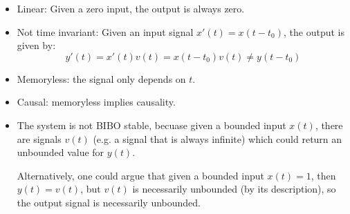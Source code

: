 \documentclass[10pt]{article}
\begin{document}
\begin{enumerate}[label=\alph*)]
			\begin{solution}
				\begin{itemize}
					\item Linear: Given a zero input, the output is always zero.
					\item Not time invariant: Given an input signal \( x'(t) = x(t - t_0) \), the output is given by: 
						\[
						y'(t) = x'(t)v(t) = x(t - t_0) v(t)  \neq y(t - t_0)
						\] 
					\item Memoryless: the signal only depends on \( t \). 
					\item Causal: memoryless implies causality.
					\item The system is not BIBO stable, becuase given a bounded input \( x(t) \), there are 
						signals \( v(t) \) (e.g. a signal that is always infinite) which could return 
						an unbounded value for \( y(t) \).  

						Alternatively, one could argue that given a bounded input \( x(t) = 1 \), then 
						\( y(t) = v(t) \), but \( v(t)  \) is necessarily unbounded (by its description), so the 
						output signal is necessarily unbounded. 
				\end{itemize}
			\end{solution}
	\end{enumerate}
	\pagebreak
\end{document}
